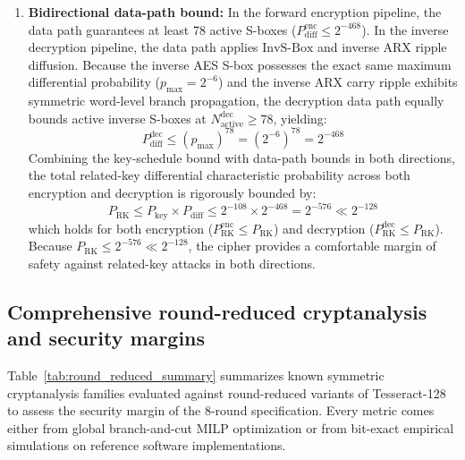 \documentclass[review,12pt]{elsarticle}
\begin{document}
\begin{enumerate}
    \item \textbf{Bidirectional data-path bound:} In the forward encryption pipeline, the data path guarantees at least 78 active S-boxes ($P_{\text{diff}}^{\text{enc}} \le 2^{-468}$). In the inverse decryption pipeline, the data path applies $\text{InvS-Box}$ and inverse ARX ripple diffusion. Because the inverse AES S-box possesses the exact same maximum differential probability ($p_{\max} = 2^{-6}$) and the inverse ARX carry ripple exhibits symmetric word-level branch propagation, the decryption data path equally bounds active inverse S-boxes at $N_{\text{active}}^{\text{dec}} \ge 78$, yielding:
    \begin{equation}
        P_{\text{diff}}^{\text{dec}} \le (p_{\max})^{78} = (2^{-6})^{78} = 2^{-468}
    \end{equation}
    Combining the key-schedule bound with data-path bounds in both directions, the total related-key differential characteristic probability across both encryption and decryption is rigorously bounded by:
    \begin{equation}
        P_{\text{RK}} \le P_{\text{key}} \times P_{\text{diff}} \le 2^{-108} \times 2^{-468} = 2^{-576} \ll 2^{-128}
    \end{equation}
    which holds for both encryption ($P_{\text{RK}}^{\text{enc}} \le P_{\text{RK}}$) and decryption ($P_{\text{RK}}^{\text{dec}} \le P_{\text{RK}}$). Because $P_{\text{RK}} \le 2^{-576} \ll 2^{-128}$, the cipher provides a comfortable margin of safety against related-key attacks in both directions.
\end{enumerate}

\subsection{Comprehensive round-reduced cryptanalysis and security margins}
Table~\ref{tab:round_reduced_summary} summarizes known symmetric cryptanalysis families evaluated against round-reduced variants of Tesseract-128 to assess the security margin of the 8-round specification. Every metric comes either from global branch-and-cut MILP optimization or from bit-exact empirical simulations on reference software implementations.
\end{document}
